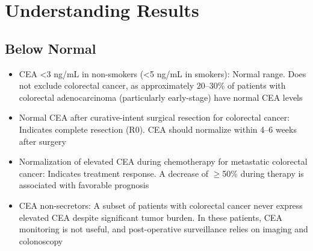 \section*{Understanding Results}

\subsection*{Below Normal}
\begin{itemize}
  \item CEA <3 ng/mL in non-smokers (<5 ng/mL in smokers): Normal range. Does not exclude colorectal cancer, as approximately 20--30\% of patients with colorectal adenocarcinoma (particularly early-stage) have normal CEA levels
  \item Normal CEA after curative-intent surgical resection for colorectal cancer: Indicates complete resection (R0). CEA should normalize within 4--6 weeks after surgery
  \item Normalization of elevated CEA during chemotherapy for metastatic colorectal cancer: Indicates treatment response. A decrease of $\geq$50\% during therapy is associated with favorable prognosis
  \item CEA non-secretors: A subset of patients with colorectal cancer never express elevated CEA despite significant tumor burden. In these patients, CEA monitoring is not useful, and post-operative surveillance relies on imaging and colonoscopy
\end{itemize}

